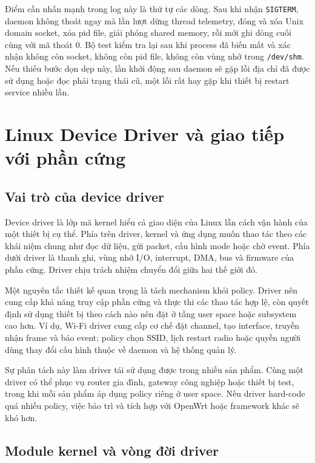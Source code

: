 \documentclass[11pt]{article}
\newcommand{\code}[1]{\texttt{#1}}
\begin{document}
Điểm cần nhấn mạnh trong log này là thứ tự các dòng. Sau khi nhận \code{SIGTERM}, daemon không thoát ngay mà lần lượt dừng thread telemetry, đóng và xóa Unix domain socket, xóa pid file, giải phóng shared memory, rồi mới ghi dòng cuối cùng với mã thoát 0. Bộ test kiểm tra lại sau khi process đã biến mất và xác nhận không còn socket, không còn pid file, không còn vùng nhớ trong \code{/dev/shm}. Nếu thiếu bước dọn dẹp này, lần khởi động sau daemon sẽ gặp lỗi địa chỉ đã được sử dụng hoặc đọc phải trạng thái cũ, một lỗi rất hay gặp khi thiết bị restart service nhiều lần.

\section{Linux Device Driver và giao tiếp với phần cứng}

\subsection{Vai trò của device driver}

Device driver là lớp mã kernel hiểu cả giao diện của Linux lẫn cách vận hành của một thiết bị cụ thể. Phía trên driver, kernel và ứng dụng muốn thao tác theo các khái niệm chung như đọc dữ liệu, gửi packet, cấu hình mode hoặc chờ event. Phía dưới driver là thanh ghi, vùng nhớ I/O, interrupt, DMA, bus và firmware của phần cứng. Driver chịu trách nhiệm chuyển đổi giữa hai thế giới đó.

Một nguyên tắc thiết kế quan trọng là tách mechanism khỏi policy. Driver nên cung cấp khả năng truy cập phần cứng và thực thi các thao tác hợp lệ, còn quyết định sử dụng thiết bị theo cách nào nên đặt ở tầng user space hoặc subsystem cao hơn. Ví dụ, Wi-Fi driver cung cấp cơ chế đặt channel, tạo interface, truyền nhận frame và báo event; policy chọn SSID, lịch restart radio hoặc quyền người dùng thay đổi cấu hình thuộc về daemon và hệ thống quản lý.

Sự phân tách này làm driver tái sử dụng được trong nhiều sản phẩm. Cùng một driver có thể phục vụ router gia đình, gateway công nghiệp hoặc thiết bị test, trong khi mỗi sản phẩm áp dụng policy riêng ở user space. Nếu driver hard-code quá nhiều policy, việc bảo trì và tích hợp với OpenWrt hoặc framework khác sẽ khó hơn.

\subsection{Module kernel và vòng đời driver}
\end{document}
